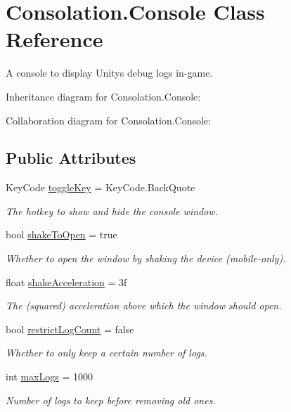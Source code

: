\hypertarget{class_consolation_1_1_console}{}\section{Consolation.\+Console Class Reference}
\label{class_consolation_1_1_console}


A console to display Unity\textquotesingle{}s debug logs in-\/game.  




Inheritance diagram for Consolation.\+Console\+:


Collaboration diagram for Consolation.\+Console\+:
\subsection*{Public Attributes}
\begin{DoxyCompactItemize}
\item 
Key\+Code \hyperlink{class_consolation_1_1_console_a0abe49a2176e1cdb26e0a8ee01cc9285}{toggle\+Key} = Key\+Code.\+Back\+Quote
\begin{DoxyCompactList}\small\item\em The hotkey to show and hide the console window. \end{DoxyCompactList}\item 
bool \hyperlink{class_consolation_1_1_console_a2234a0d38ecebf01047df1faf2c0bdb0}{shake\+To\+Open} = true
\begin{DoxyCompactList}\small\item\em Whether to open the window by shaking the device (mobile-\/only). \end{DoxyCompactList}\item 
float \hyperlink{class_consolation_1_1_console_a3eb8d249b0d73bc896515a5965bb2467}{shake\+Acceleration} = 3f
\begin{DoxyCompactList}\small\item\em The (squared) acceleration above which the window should open. \end{DoxyCompactList}\item 
bool \hyperlink{class_consolation_1_1_console_af10997cc4b9782f092b0d82c3733d5b1}{restrict\+Log\+Count} = false
\begin{DoxyCompactList}\small\item\em Whether to only keep a certain number of logs. \end{DoxyCompactList}\item 
int \hyperlink{class_consolation_1_1_console_a2a3269af95bf12bcaec325f4dd54c236}{max\+Logs} = 1000
\begin{DoxyCompactList}\small\item\em Number of logs to keep before removing old ones. \end{DoxyCompactList}\end{DoxyCompactItemize}


